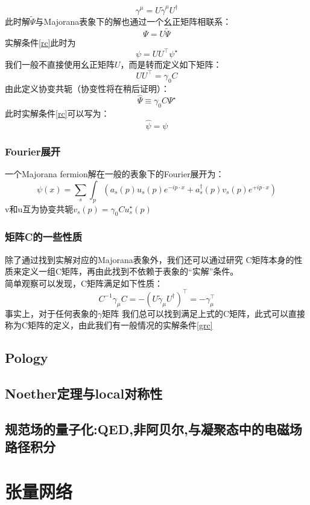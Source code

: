 \documentclass[12pt, a4paper, oneside]{ctexbook}
\def\gm{$ \gamma $矩阵 }
\begin{document}
	\begin{equation}
		\gamma^\mu=U \tilde{\gamma}^\mu U^{\dagger}
	\end{equation}
	此时解$ \tilde{\Psi} $与Majorana表象下的解也通过一个幺正矩阵相联系：
	\begin{equation}
		\Psi=U \tilde{\Psi}
	\end{equation} 
	实解条件\eqref{rc}此时为
	\begin{equation}
		\psi=U U^{\top} \psi^{\star}
	\end{equation}
	我们一般不直接使用幺正矩阵$ U $，而是转而定义如下矩阵：
	\begin{equation}
		U U^{\top}=\gamma_0 C
	\end{equation} 
	由此定义协变共轭（协变性将在稍后证明）：
	\begin{equation}
		\hat{\Psi} \equiv \gamma_0 C \Psi^{\star}
	\end{equation}
	此时实解条件\eqref{rc}可以写为：
	\begin{equation}
		\hat{\psi}=\psi\label{grc}
	\end{equation}
	\subsection{Fourier展开}
	一个Majorana fermion解在一般的表象下的Fourier展开为：
	\begin{equation}
		\psi(x)=\sum_s \int_p\left(a_s(p) u_s(p) e^{-i p \cdot x}+a_s^{\dagger}(p) v_s(p) e^{+i p \cdot x}\right)
	\end{equation}
	v和u互为协变共轭$ v_s(p)=\gamma_0 C u_s^{\star}(p) $
	\subsection{矩阵C的一些性质}
	除了通过找到实解对应的Majorana表象外，我们还可以通过研究 C矩阵本身的性质来定义一组C矩阵，再由此找到不依赖于表象的“实解”条件。\\
	简单观察可以发现，C矩阵满足如下性质：
	\begin{equation}
		C^{-1} \gamma_\mu C=-\left(U \tilde{\gamma}_\mu U^{\dagger}\right)^{\top}=-\gamma_\mu^{\top}
	\end{equation} 
	事实上，对于任何表象的\gm 我们总可以找到满足上式的C矩阵，此式可以直接称为C矩阵的定义，由此我们有一般情况的实解条件\eqref{grc}
    \section{Pology}
	\section{Noether定理与local对称性}
    \section{规范场的量子化:QED,非阿贝尔,与凝聚态中的电磁场路径积分}
	\chapter{张量网络}
	
	
\end{document}
